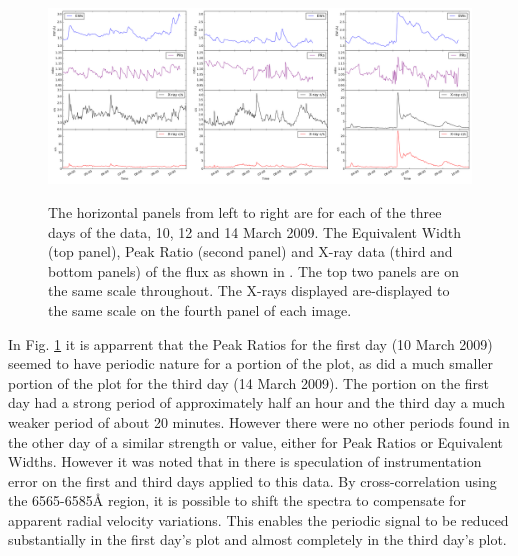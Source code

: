 \begin{figure}[!htbp]
\begin{center}
\includegraphics[scale=0.18]{Figures/uvrx-onepic.png} \\
\end{center}   
\caption{The horizontal panels from left to right are for each of the three days of the {\uves} data, 10, 12 and 14
  March 2009.  The Equivalent Width (top panel), Peak Ratio (second panel) and X-ray data (third and bottom panels) of the
  {\ha} flux as shown in \citet[Fig. 1 to Fig.3]{fuhrmeister11}. The top two panels are on the same scale
  throughout. The X-rays displayed are-displayed to the same scale on the fourth panel of each image.}
 \protect\label{fig:uvrxp1}
\end{figure}

In Fig. \ref{fig:uvrxp1} it is apparrent that the Peak Ratios for the first day (10 March 2009) seemed to have
periodic nature for a portion of the plot, as did a much smaller portion of the plot for the third day (14 March
2009). The portion on the first day had a strong period of approximately half an hour and the third day a much weaker
period of about 20 minutes.  However there were no other periods found in the other day of a similar strength or value,
either for Peak Ratios or Equivalent Widths. However it was noted that in \citet[Section 4.1]{barnes14} there is
speculation of instrumentation error on the first and third days applied to this data. By cross-correlation using the
6565-6585{\AA} region, it is possible to shift the spectra to compensate for apparent radial velocity variations. This
enables the periodic signal to be reduced substantially in the first day's plot and almost completely in the third day's
plot.


